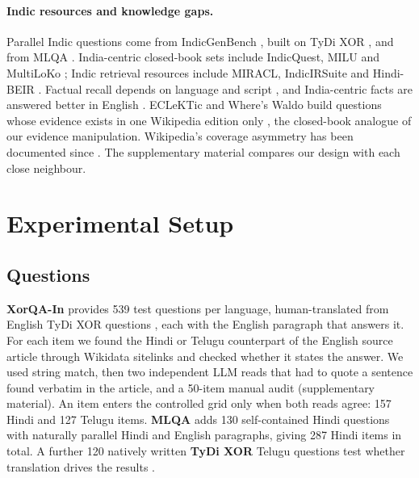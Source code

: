 \paragraph{Indic resources and knowledge gaps.} Parallel Indic questions come from IndicGenBench \citep{a2404_16816}, built on TyDi XOR \citep{a2010_11856,clark2020tydi}, and from MLQA \citep{a1910_07475}. India-centric closed-book sets include IndicQuest, MILU and MultiLoKo \citep{a2608_15535,a2504_20022,a2411_02538,a2504_10356}; Indic retrieval resources include MIRACL, IndicIRSuite and Hindi-BEIR \citep{a2210_09984,a2312_09508,a2408_09437}. Factual recall depends on language and script \citep{a2010_06189,a2406_16135,a2510_15551}, and India-centric facts are answered better in English \citep{a2504_20022,a2605_29637}. ECLeKTic and Where's Waldo build questions whose evidence exists in one Wikipedia edition only \citep{a2502_21228,a2610_00606}, the closed-book analogue of our evidence manipulation. Wikipedia's coverage asymmetry has been documented since \citet{hecht2010tower}. The supplementary material compares our design with each close neighbour.

\section{Experimental Setup}
\label{sec:setup}

\subsection{Questions}
\label{sec:questions}
\textbf{XorQA-In} \citep{a2404_16816} provides 539 test questions per language, human-translated from English TyDi XOR questions \citep{a2010_11856}, each with the English paragraph that answers it. For each item we found the Hindi or Telugu counterpart of the English source article through Wikidata sitelinks and checked whether it states the answer. We used string match, then two independent LLM reads that had to quote a sentence found verbatim in the article, and a 50-item manual audit (supplementary material). An item enters the controlled grid only when both reads agree: 157 Hindi and 127 Telugu items. \textbf{MLQA} \citep{a1910_07475} adds 130 self-contained Hindi questions with naturally parallel Hindi and English paragraphs, giving 287 Hindi items in total. A further 120 natively written \textbf{TyDi XOR} Telugu questions test whether translation drives the results \citep{a2604_24929}.

